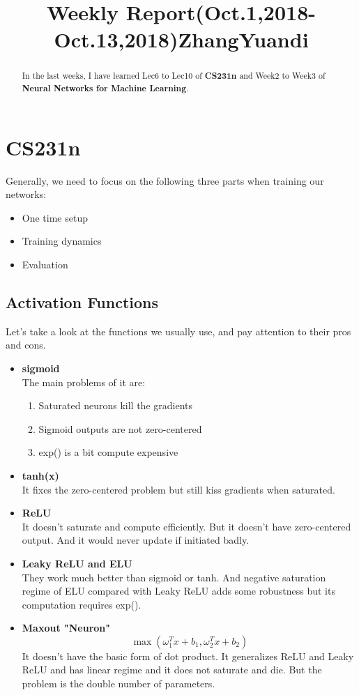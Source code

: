 \documentclass{article}
\title{Weekly Report(Oct.1,2018-Oct.13,2018)ZhangYuandi}
\begin{document}
\maketitle

\begin{abstract}
  In the last weeks, I have learned Lec6 to Lec10 of \textbf{CS231n} and Week2 to Week3 of \textbf{Neural Networks for Machine Learning}.
\end{abstract}

\section{CS231n}
Generally, we need to focus on the following three parts when training our networks:
\begin{itemize}
  \item One time setup
  \item Training dynamics
  \item Evaluation
\end{itemize}

\subsection{Activation Functions}
Let's take a look at the functions we usually use, and pay attention to their pros and cons.
\begin{itemize}
  \item \textbf{sigmoid} \\
         The main problems of it are:
         \begin{enumerate}
           \item Saturated neurons kill the gradients
           \item Sigmoid outputs are not zero-centered
           \item exp() is a bit compute expensive
         \end{enumerate}
  \item \textbf{tanh(x)} \\
          It fixes the zero-centered problem but still kiss gradients when saturated.
  \item \textbf{ReLU} \\
          It doesn't saturate and compute efficiently. But it doesn't have zero-centered output. And it would never update if initiated badly.
  \item \textbf{Leaky ReLU and ELU} \\
          They work much better than sigmoid or tanh. And negative saturation regime of ELU compared with Leaky ReLU adds some robustness but its computation requires exp().
  \item \textbf{Maxout "Neuron"}
          \[\max(\omega_1^Tx + b_1, \omega_2^Tx + b_2)\]
          It doesn't have the basic form of dot product. It generalizes ReLU and Leaky ReLU and has linear regime and it does not saturate and die. But the problem is the double number of parameters.
\end{itemize}
\end{document}
